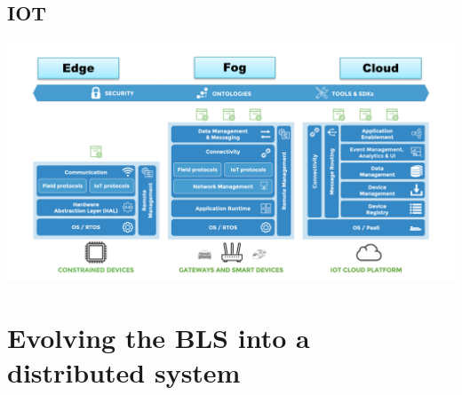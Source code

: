 \documentclass[10pt,a4paper,openright,twoside]{C:/Didattica/git/lab2014Bo/it.unibo.iss2015intro/docsInternal/contents/llncs}
\begin{document}

\subsection{IOT}
\medskip 
\includegraphics[scale = 0.5]{img/iot3TecnoStack.png}



\newpage
\section{Evolving the BLS into a distributed system}
\end{document}
